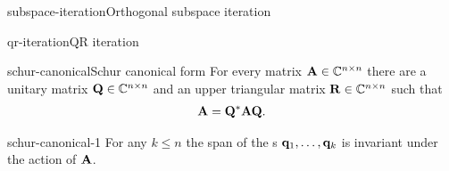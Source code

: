 \begin{Algorithm*}{subspace-iteration}{Orthogonal subspace iteration}
  
\end{Algorithm*}

\begin{Algorithm*}{qr-iteration}{QR iteration}
  
\end{Algorithm*}

\begin{Theorem*}{schur-canonical}{Schur canonical form}
  For every matrix $\mathbf A\in\mathbb C^{n\times n}$ there are a unitary matrix
  $\mathbf Q\in\mathbb C^{n\times n}$ and an upper triangular matrix $\mathbf R\in\mathbb C^{n\times n}$ such
  that
  \begin{gather}
    \mathbf A = \mathbf Q^* \mathbf A \mathbf Q.
  \end{gather}
\end{Theorem*}

\begin{Lemma}{schur-canonical-1}
  For any $k\le n$ the span of the s
  $\mathbf q_1,\dots,\mathbf q_k$ is invariant under the action of $\mathbf A$.
\end{Lemma}

